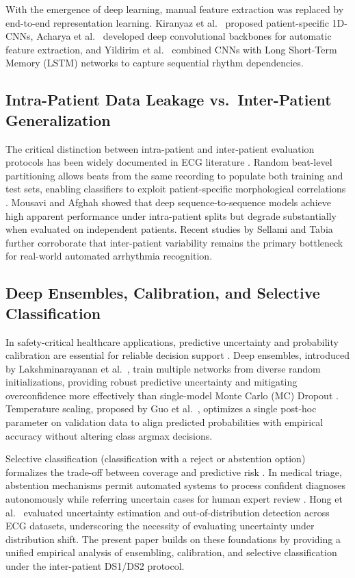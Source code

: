 \documentclass[conference]{IEEEtran}
\begin{document}
With the emergence of deep learning, manual feature extraction was replaced by end-to-end representation learning. Kiranyaz et al.\ \cite{b4} proposed patient-specific 1D-CNNs, Acharya et al.\ \cite{b5} developed deep convolutional backbones for automatic feature extraction, and Yildirim et al.\ \cite{b15} combined CNNs with Long Short-Term Memory (LSTM) networks to capture sequential rhythm dependencies.

\subsection{Intra-Patient Data Leakage vs.\ Inter-Patient Generalization}
The critical distinction between intra-patient and inter-patient evaluation protocols has been widely documented in ECG literature \cite{b3,b12,b13}. Random beat-level partitioning allows beats from the same recording to populate both training and test sets, enabling classifiers to exploit patient-specific morphological correlations \cite{b13}. Mousavi and Afghah \cite{b12} showed that deep sequence-to-sequence models achieve high apparent performance under intra-patient splits but degrade substantially when evaluated on independent patients. Recent studies by Sellami and Tabia \cite{b19} further corroborate that inter-patient variability remains the primary bottleneck for real-world automated arrhythmia recognition.

\subsection{Deep Ensembles, Calibration, and Selective Classification}
In safety-critical healthcare applications, predictive uncertainty and probability calibration are essential for reliable decision support \cite{b18}. Deep ensembles, introduced by Lakshminarayanan et al.\ \cite{b7}, train multiple networks from diverse random initializations, providing robust predictive uncertainty and mitigating overconfidence more effectively than single-model Monte Carlo (MC) Dropout \cite{b8}. Temperature scaling, proposed by Guo et al.\ \cite{b9}, optimizes a single post-hoc parameter on validation data to align predicted probabilities with empirical accuracy without altering class argmax decisions.

Selective classification (classification with a reject or abstention option) formalizes the trade-off between coverage and predictive risk \cite{b17,b20}. In medical triage, abstention mechanisms permit automated systems to process confident diagnoses autonomously while referring uncertain cases for human expert review \cite{b18}. Hong et al.\ \cite{b20} evaluated uncertainty estimation and out-of-distribution detection across ECG datasets, underscoring the necessity of evaluating uncertainty under distribution shift. The present paper builds on these foundations by providing a unified empirical analysis of ensembling, calibration, and selective classification under the inter-patient DS1/DS2 protocol.
\end{document}
